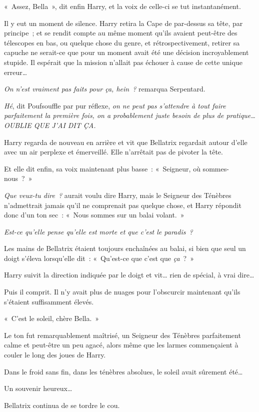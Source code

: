 «~Assez, Bella~», dit enfin Harry, et la voix de celle-ci se tut instantanément.

Il y eut un moment de silence. Harry retira la Cape de par-dessus sa tête, par principe~; et se rendit compte au même moment qu'ils avaient peut-être des télescopes en bas, ou quelque chose du genre, et rétrospectivement, retirer sa capuche ne serait-ce que pour un moment avait été une décision incroyablement stupide. Il espérait que la mission n'allait pas échouer à cause de cette unique erreur…

\emph{On n'est vraiment pas faits pour ça, hein~?} remarqua Serpentard.

\emph{Hé}, dit Poufsouffle par pur réflexe, \emph{on ne peut pas s'attendre à tout faire parfaitement la première fois, on a probablement juste besoin de plus de pratique…OUBLIE QUE J'AI DIT ÇA.}

Harry regarda de nouveau en arrière et vit que Bellatrix regardait autour d'elle avec un air perplexe et émerveillé. Elle n'arrêtait pas de pivoter la tête.

Et elle dit enfin, sa voix maintenant plus basse~: «~Seigneur, où sommes-nous~?~»

\emph{Que veux-tu dire~?} aurait voulu dire Harry, mais le Seigneur des Ténèbres n'admettrait jamais qu'il ne comprenait pas quelque chose, et Harry répondit donc d'un ton sec~: «~Nous sommes sur un balai volant.~»

\emph{Est-ce qu'elle pense qu'elle est morte et que c'est le paradis~?}

Les mains de Bellatrix étaient toujours enchaînées au balai, si bien que seul un doigt s'éleva lorsqu'elle dit~: «~Qu'est-ce que c'est que \emph{ça}~?~»

Harry suivit la direction indiquée par le doigt et vit… rien de spécial, à vrai dire…

Puis il comprit. Il n'y avait plus de nuages pour l'obscurcir maintenant qu'ils s'étaient suffisamment élevés.

«~C'est le soleil, chère Bella.~»

Le ton fut remarquablement maîtrisé, un Seigneur des Ténèbres parfaitement calme et peut-être un peu agacé, alors même que les larmes commençaient à couler le long des joues de Harry.

Dans le froid sans fin, dans les ténèbres absolues, le soleil avait sûrement été…

Un souvenir heureux…

Bellatrix continua de se tordre le cou.

